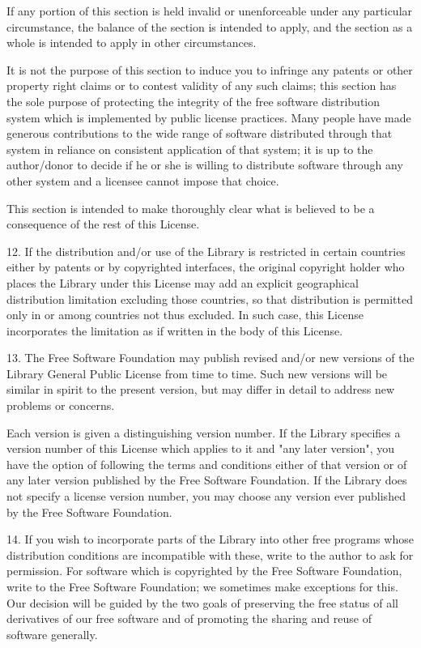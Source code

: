 \documentclass[twoside]{tceusermanual}
\begin{document}
If any portion of this section is held invalid or unenforceable
under any particular circumstance, the balance of the section is
intended to apply, and the section as a whole is intended to
apply in other circumstances.

It is not the purpose of this section to induce you to infringe
any patents or other property right claims or to contest
validity of any such claims; this section has the sole purpose
of protecting the integrity of the free software distribution
system which is implemented by public license practices.  Many
people have made generous contributions to the wide range of
software distributed through that system in reliance on
consistent application of that system; it is up to the
author/donor to decide if he or she is willing to distribute
software through any other system and a licensee cannot impose
that choice.

This section is intended to make thoroughly clear what is
believed to be a consequence of the rest of this License.

12. If the distribution and/or use of the Library is restricted
in certain countries either by patents or by copyrighted
interfaces, the original copyright holder who places the Library
under this License may add an explicit geographical distribution
limitation excluding those countries, so that distribution is
permitted only in or among countries not thus excluded.  In such
case, this License incorporates the limitation as if written in
the body of this License.

13. The Free Software Foundation may publish revised and/or new
versions of the Library General Public License from time to
time. Such new versions will be similar in spirit to the present
version, but may differ in detail to address new problems or
concerns.

Each version is given a distinguishing version number.  If the
Library specifies a version number of this License which applies
to it and "any later version", you have the option of following
the terms and conditions either of that version or of any later
version published by the Free Software Foundation.  If the
Library does not specify a license version number, you may
choose any version ever published by the Free Software
Foundation.

14. If you wish to incorporate parts of the Library into other
free programs whose distribution conditions are incompatible
with these, write to the author to ask for permission.  For
software which is copyrighted by the Free Software Foundation,
write to the Free Software Foundation; we sometimes make
exceptions for this.  Our decision will be guided by the two
goals of preserving the free status of all derivatives of our
free software and of promoting the sharing and reuse of software
generally.
\end{document}
